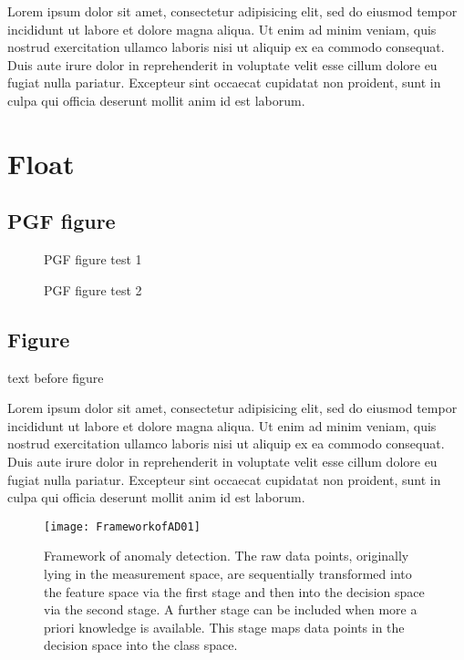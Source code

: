 \documentclass[10pt,a4paper,extrafontsizes,oldfontcommands,oneside]{memoir}
\begin{document}
Lorem ipsum dolor sit amet, consectetur adipisicing elit, sed do eiusmod tempor incididunt ut labore et dolore magna aliqua. Ut enim ad minim veniam, quis nostrud exercitation ullamco laboris nisi ut aliquip ex ea commodo consequat. Duis aute irure dolor in reprehenderit in voluptate velit esse cillum dolore eu fugiat nulla pariatur. Excepteur sint occaecat cupidatat non proident, sunt in culpa qui officia deserunt mollit anim id est laborum.





\section{Float} %
\label{sec:float}

\subsection{PGF figure} %
\label{sub:pgf_figure}

\begin{figure}[!htbp]

\caption{PGF figure test 1}
\label{fig:pgftest}
\end{figure}

\begin{figure}[!htbp]

\caption{PGF figure test 2}
\label{fig:pgftest2}
\end{figure}



\subsection{Figure} %
\label{sub:figure}

text before figure

Lorem ipsum dolor sit amet, consectetur adipisicing elit, sed do eiusmod tempor incididunt ut labore et dolore magna aliqua. Ut enim ad minim veniam, quis nostrud exercitation ullamco laboris nisi ut aliquip ex ea commodo consequat. Duis aute irure dolor in reprehenderit in voluptate velit esse cillum dolore eu fugiat nulla pariatur. Excepteur sint occaecat cupidatat non proident, sunt in culpa qui officia deserunt mollit anim id est laborum.

\begin{figure}[!htbp]
\centering{}\texttt{[image: FrameworkofAD01]} \caption{Framework of anomaly detection. The raw data points, originally lying
in the measurement space, are sequentially transformed into the feature
space via the first stage and then into the decision space via the
second stage. A further stage can be included when more a priori knowledge
is available. This stage maps data points in the decision space into
the class space.}
\label{fig:ADFramework}
\end{figure}
\end{document}
